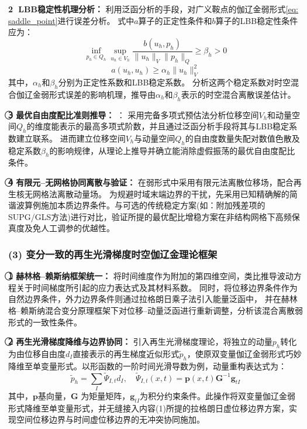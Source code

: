 \textbf{\textcircled{\small 2} LBB稳定性机理分析：}
利用泛函分析的手段，对广义鞍点的伽辽金弱形式\eqref{eq: saddle_point}进行误差分析。
式中$a$算子的正定性条件和$b$算子的LBB稳定性条件应为：
\begin{equation}
    \inf_{p_h \in Q_h} \sup_{u_h \in V_h} \frac{b(u_h, p_h)}{\lVert u_h \rVert_{V} \lVert p_h \rVert_{Q}} \ge \beta_{h} > 0
\end{equation}
\begin{equation}
    a(u_h, u_h) \ge \alpha_h \lVert u_h \rVert_{V}^2
\end{equation}
其中，$\alpha_h$和$\beta_h$分别为正定性系数和LBB稳定系数。
分析这两个稳定系数对时空混合伽辽金弱形式误差的影响机理，推导由$\alpha_h$和$\beta_h$表示的时空混合离散误差估计。

\textbf{\textcircled{\small 3} 最优自由度配比准则推导：} ：
采用完备多项式预估法分析位移空间$V_h$和动量空间$Q_h$的维度能表示的最高多项式阶数，并且通过泛函分析手段将其与LBB稳定系数建立联系。
进而建立位移空间$V_h$与动量空间$Q_h$的自由度数量失配对数值色散及稳定系数$\beta_h$的影响规律，从理论上推导并确立能消除虚假振荡的最优自由度配比条件。

\textbf{\textcircled{\small 4} 有限元--无网格协同离散与验证：} 在弱形式中采用有限元法离散位移场，配合再生核无网格法离散动量场。
为规避时域末端边界的干扰，先采用已知精确解的简谐波算例施加本质边界条件。与可选的传统稳定方案(如：附加残差项的SUPG/GLS方法)进行对比，验证所提的最优配比增稳方案在非结构网格下高频保真度及免人工调参的优越性。

\subsubsection*{\bfseries (3) 变分一致的再生光滑梯度时空伽辽金理论框架}

\textbf{\textcircled{\small 1} 赫林格--赖斯纳框架统一：} 将时间维度作为附加的第四维空间，类比推导波动方程关于时间梯度所引起的应力表达式及其材料系数。
同时，将位移边界条件作为自然边界条件，外力边界条件则通过拉格朗日乘子法引入能量泛函中，
并在赫林格--赖斯纳混合变分原理框架下对位移--动量泛函进行重新调整，分析该混合离散弱形式的一致性条件。

\textbf{\textcircled{\small 2} 再生光滑梯度降维与边界协同：} 引入再生光滑梯度理论，将独立的动量$p_h$转化为由位移自由度$d_I$直接表示的再生梯度近似形式$\tilde p_h$，使原双变量伽辽金弱形式巧妙降维至单变量形式。以形函数的一阶时间光滑导数为例，动量重构表达式为：
\begin{equation}
    \tilde p_h = \sum_I \tilde \Psi_{I,t} d_I, \quad \tilde \Psi_{I,t}(x, t) = \pmb p(x, t) \pmb G^{-1} \pmb g_{tI}
\end{equation}
其中，$\pmb p$基向量，$\pmb G$ 为矩量矩阵，$\pmb g_{tI}$为积分约束条件。此操作将双变量伽辽金弱形式降维至单变量形式，并无缝接入内容(1)所提的拉格朗日虚位移边界方案，实现空间位移边界与时间虚位移边界的无冲突协同施加。

